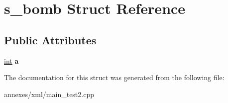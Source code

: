 \hypertarget{structs__bomb}{}\section{s\+\_\+bomb Struct Reference}
\label{structs__bomb}
\subsection*{Public Attributes}
\begin{DoxyCompactItemize}
\item 
\hypertarget{structs__bomb_adc4ccaa16bcefd70a01a25d3bafbc46a}{}\hyperlink{_s_d_l__thread_8h_a6a64f9be4433e4de6e2f2f548cf3c08e}{int} {\bfseries a}\label{structs__bomb_adc4ccaa16bcefd70a01a25d3bafbc46a}

\end{DoxyCompactItemize}


The documentation for this struct was generated from the following file\+:\begin{DoxyCompactItemize}
\item 
annexes/xml/main\+\_\+test2.\+cpp\end{DoxyCompactItemize}
